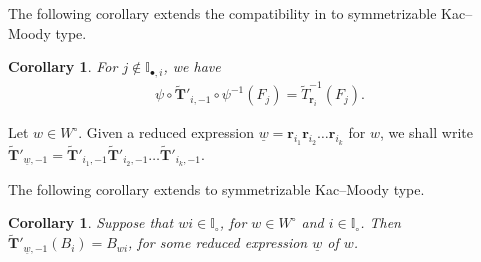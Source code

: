 \documentclass[a4paper,reqno,12pt]{amsart}
\numberwithin{equation}{section}
\newtheorem{corollary}[proposition]{Corollary}
\theoremstyle{definition}
\theoremstyle{plain}
\theoremstyle{definition}
\def\I{\mathbb I}
\def\wI{\I_\circ}
\def\bIi{\I_{\bullet,i}}
\def\br{\mathbf r}
\def\tTD{\widetilde T}
\def\tTT{\widetilde{\mathbf T}}
\newcommand{\tTa}[1]{\tTT'_{#1,-1}}
\begin{document}
The following corollary extends the compatibility in \cite[Proposition 3.9]{SZ25} to symmetrizable Kac–Moody type.
\begin{corollary}
For $j\notin\bIi$, we have
\begin{align*}
\psi\circ\tTa{i}\circ\psi^{-1}(F_j)=\tTD_{\br_i}^{-1}(F_j).
\end{align*}
\end{corollary}

Let $w\in W^\circ$. Given a reduced expression $\underline{w} =\br_{i_1} \br_{i_2} \ldots \br_{i_k}$ for $w$, we shall write $\tTT'_{\underline{w},-1} =\tTT'_{i_1,-1} \tTT'_{i_2,-1} \ldots \tTT'_{i_k,-1}$.

The following corollary extends \cite[Theorem 7.13]{WZ23} to symmetrizable Kac–Moody type.
\begin{corollary}
\label{thm:fact1}
Suppose that $wi\in \wI$, for $w\in W^\circ$ and $i\in \wI$. Then $\tTT'_{\underline{w},-1}(B_i)=B_{wi}$, for {\em some} reduced expression $\underline{w}$ of $w$.    
\end{corollary}
\end{document}

